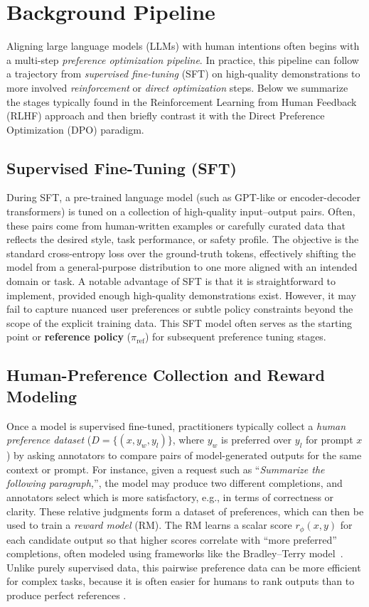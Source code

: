 \documentclass[a4paper,oneside,10pt,ngerman,english]{scrartcl}
\begin{document}
\section{Background Pipeline}
\label{sec:background}

Aligning large language models (LLMs) with human intentions often begins with a multi-step
\emph{preference optimization pipeline}. In practice, this pipeline can follow a trajectory from
\emph{supervised fine-tuning} (SFT) on high-quality demonstrations to more involved \emph{reinforcement}
or \emph{direct optimization} steps. Below we summarize the stages typically found in the Reinforcement
Learning from Human Feedback (RLHF) approach and then briefly contrast it with the Direct Preference
Optimization (DPO) paradigm.

\subsection{Supervised Fine-Tuning (SFT)}
During SFT, a pre-trained language model (such as GPT-like or encoder-decoder transformers) is tuned
on a collection of high-quality input--output pairs. Often, these pairs come from human-written
examples or carefully curated data that reflects the desired style, task performance, or safety
profile. The objective is the standard cross-entropy loss over the ground-truth tokens, effectively shifting
the model from a general-purpose distribution to one more aligned with an intended domain or task.
A notable advantage of SFT is that it is straightforward to implement, provided enough high-quality
demonstrations exist. However, it may fail to capture nuanced user preferences or subtle policy constraints
beyond the scope of the explicit training data. This SFT model often serves as the starting point or \textbf{reference policy} ($\pi_{\text{ref}}$) for subsequent preference tuning stages.

\subsection{Human-Preference Collection and Reward Modeling}
Once a model is supervised fine-tuned, practitioners typically collect a \emph{human preference dataset}
($D = \{(x, y_w, y_l)\}$, where $y_w$ is preferred over $y_l$ for prompt $x$) by asking annotators to compare pairs of model-generated outputs for the same context or prompt. For
instance, given a request such as ``\textit{Summarize the following paragraph,}'', the model may
produce two different completions, and annotators select which is more satisfactory, e.g., in terms
of correctness or clarity. These relative judgments form a dataset of preferences, which can then be
used to train a \emph{reward model} (RM). The RM learns a scalar score $r_\phi(x, y)$ for each candidate output so
that higher scores correlate with ``more preferred'' completions, often modeled using frameworks like the Bradley--Terry model~\cite{bib:bradley1952rank}. Unlike purely supervised data, this
pairwise preference data can be more efficient for complex tasks, because it is often easier for humans to
rank outputs than to produce perfect references \cite{bib:stiennon2020learning}.
\end{document}
